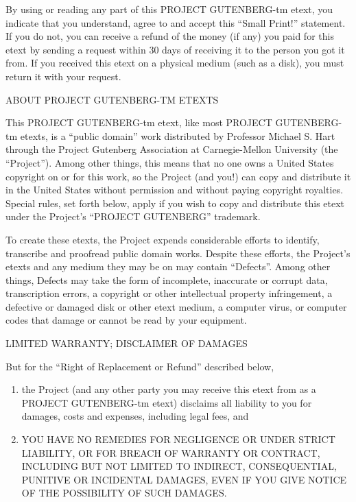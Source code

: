 \documentclass[12pt]{book}
\begin{document}
By using or reading any part of this PROJECT GUTENBERG-tm
etext, you indicate that you understand, agree to and accept
this ``Small Print!'' statement.  If you do not, you can receive
a refund of the money (if any) you paid for this etext by
sending a request within 30 days of receiving it to the person
you got it from.  If you received this etext on a physical
medium (such as a disk), you must return it with your request.

\begin{center}
ABOUT PROJECT GUTENBERG-TM ETEXTS
\end{center}

This PROJECT GUTENBERG-tm etext, like most PROJECT GUTEN\-BERG-
tm etexts, is a ``public domain'' work distributed by Professor
Michael S. Hart through the Project Gutenberg Association at
Carnegie-Mellon University (the ``Project'').  Among other
things, this means that no one owns a United States copyright
on or for this work, so the Project (and you!) can copy and
distribute it in the United States without permission and
without paying copyright royalties.  Special rules, set forth
below, apply if you wish to copy and distribute this etext
under the Project's ``PROJECT GUTENBERG'' trademark.

To create these etexts, the Project expends considerable
efforts to identify, transcribe and proofread public domain
works.  Despite these efforts, the Project's etexts and any
medium they may be on may contain ``Defects''.  Among other
things, Defects may take the form of incomplete, inaccurate or
corrupt data, transcription errors, a copyright or other
intellectual property infringement, a defective or damaged
disk or other etext medium, a computer virus, or computer
codes that damage or cannot be read by your equipment.

\begin{center}
LIMITED WARRANTY; DISCLAIMER OF DAMAGES
\end{center}

But for the ``Right of Replacement or Refund'' described below,
\begin{enumerate}
\item the Project (and any other party you may receive this
etext from as a PROJECT GUTENBERG-tm etext) disclaims all
liability to you for damages, costs and expenses, including
legal fees, and
\item YOU HAVE NO REMEDIES FOR NEGLIGENCE OR
UNDER STRICT LIABILITY, OR FOR BREACH OF WARRANTY OR CONTRACT,
INCLUDING BUT NOT LIMITED TO INDIRECT, CONSEQUENTIAL, PUNITIVE
OR INCIDENTAL DAMAGES, EVEN IF YOU GIVE NOTICE OF THE
POSSIBILITY OF SUCH DAMAGES.
\end{enumerate}
\end{document}
